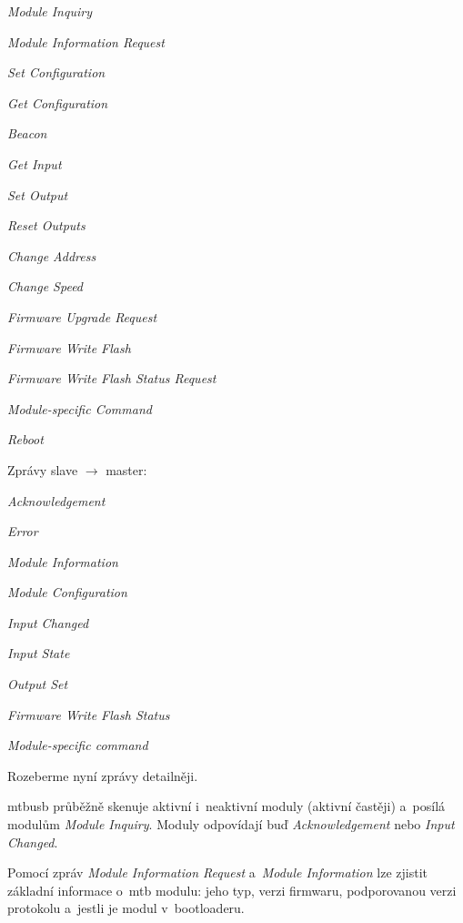 \begin{compactitem}
\item \textit{Module Inquiry}
\item \textit{Module Information Request}
\item \textit{Set Configuration}
\item \textit{Get Configuration}
\item \textit{Beacon}
\item \textit{Get Input}
\item \textit{Set Output}
\item \textit{Reset Outputs}
\item \textit{Change Address}
\item \textit{Change Speed}
\item \textit{Firmware Upgrade Request}
\item \textit{Firmware Write Flash}
\item \textit{Firmware Write Flash Status Request}
\item \textit{Module-specific Command}
\item \textit{Reboot}

\end{compactitem}

Zprávy slave $\rightarrow$ master:

\begin{compactitem}
\item \textit{Acknowledgement}
\item \textit{Error}
\item \textit{Module Information}
\item \textit{Module Configuration}
\item \textit{Input Changed}
\item \textit{Input State}
\item \textit{Output Set}
\item \textit{Firmware Write Flash Status}
\item \textit{Module-specific command}
\end{compactitem}

Rozeberme nyní zprávy detailněji.

\gls{mtbusb} průběžně skenuje aktivní i~neaktivní moduly (aktivní častěji)
a~posílá modulům \textit{Module Inquiry}. Moduly odpovídají buď
\textit{Ack\-now\-led\-ge\-ment} nebo \textit{Input Changed}.

Pomocí zpráv \textit{Module Information Request} a~\textit{Module Information}
lze zjistit základní informace o~\gls{mtb} modulu: jeho typ, verzi firmwaru,
podporovanou verzi protokolu a~jestli je modul v~bootloaderu.

